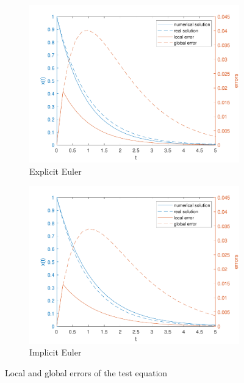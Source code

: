 \begin{figure}[h!]
\centering
    \begin{subfigure}{0.5\linewidth}
        \includegraphics[width=\linewidth]{images/1/1_3_explicit_0_2.pdf} 
        \caption{Explicit Euler}
    \end{subfigure}%
    \begin{subfigure}{0.5\linewidth}
        \includegraphics[width=\linewidth]{images/1/1_3_implicit_0_2.pdf}
        \caption{Implicit Euler}
    \end{subfigure}
    \caption{Local and global errors of the test equation}
    \label{1_3_errors}
\end{figure}

